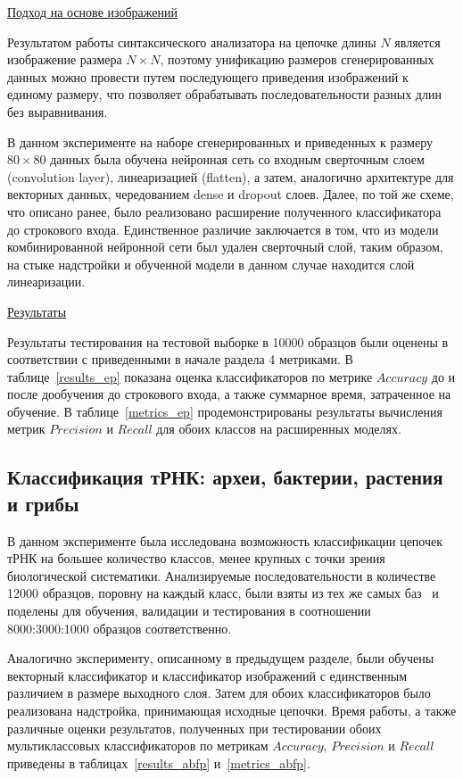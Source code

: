 \documentclass[14pt]{matmex-diploma-custom}
\begin{document}
\vspace{10pt}
\underline{Подход на основе изображений}

Результатом работы синтаксического анализатора на цепочке длины $N$ является изображение размера $N\times N$, поэтому унификацию размеров сгенерированных данных можно провести путем последующего приведения изображений к единому размеру, что позволяет обрабатывать последовательности разных длин без выравнивания.

В данном эксперименте на наборе сгенерированных и приведенных к размеру $80\times80$ данных была обучена нейронная сеть со входным сверточным слоем (convolution layer), линеаризацией (flatten), а затем, аналогично архитектуре для векторных данных, чередованием dense и dropout слоев. Далее, по той же схеме, что описано ранее, было реализовано расширение полученного классификатора до строкового входа. Единственное различие заключается в том, что из модели комбинированной нейронной сети был удален сверточный слой, таким образом, на стыке надстройки и обученной модели в данном случае находится слой линеаризации.

\vspace{10pt}
\underline{Результаты}

Результаты тестирования на тестовой выборке в 10000 образцов были оценены в соответствии с приведенными в начале раздела 4 метриками. В таблице~\ref{results_ep} показана оценка классификаторов по метрике $Accuracy$ до и после дообучения до строкового входа, а также суммарное время, затраченное на обучение. В таблице~\ref{metrics_ep} продемонстрированы результаты вычисления метрик $Precision$ и $Recall$ для обоих классов на расширенных моделях.
\vspace{10pt}




\subsection{Классификация тРНК: археи, бактерии, растения и грибы}
В данном эксперименте была исследована возможность классификации цепочек тРНК на большее количество классов, менее крупных с точки зрения биологической систематики. Анализируемые последовательности в количестве 12000 образцов, поровну на каждый класс, были взяты из тех же самых  баз~\cite{trnadb1,trnadb2} и поделены для обучения, валидации и тестирования в соотношении 8000:3000:1000 образцов соответственно.

Аналогично эксперименту, описанному в предыдущем разделе, были обучены векторный классификатор и классификатор изображений с единственным различием в размере выходного слоя. Затем для обоих классификаторов было реализована надстройка, принимающая исходные цепочки. Время работы, а также различные оценки результатов, полученных при тестировании обоих мультиклассовых классификаторов по метрикам $Accuracy$, $Precision$ и $Recall$ приведены в таблицах~\ref{results_abfp} и~\ref{metrics_abfp}.

\end{document}
